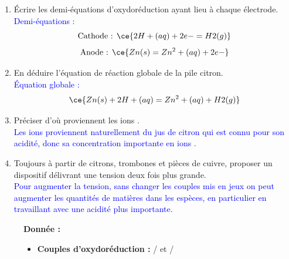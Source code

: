 \documentclass[a4paper,11pt,fleqn]{article}%
\begin{document}
\begin{enumerate}[resume]
    \item Écrire les demi-équations d'oxydoréduction ayant lieu à chaque électrode.\\
    \textcolor{blue}{Demi-équations : $$\text{Cathode : }\ce{2H+(aq) + 2e- = H2(g)}$$
    $$\text{Anode : }\ce{Zn(s) = Zn^2+(aq) + 2e-}$$}
    \item En déduire l'équation de réaction globale de la pile citron.\\
    \textcolor{blue}{Équation globale : $$\ce{Zn(s) + 2H+(aq) = Zn^2+(aq) + H2(g)}$$}
    \item Préciser d'où proviennent les ions .\\
    \textcolor{blue}{Les ions  proviennent naturellement du jus de citron qui est connu pour son acidité, donc sa concentration importante en ions .}
    \item Toujours à partir de citrons, trombones et pièces de cuivre, proposer un dispositif délivrant une tension deux fois plus grande.\\
    \textcolor{blue}{Pour augmenter la tension, sans changer les couples mis en jeux on peut augmenter les quantités de matières dans les espèces, en particulier en travaillant avec une acidité plus importante.}
\end{enumerate}

\begin{figure}[H]
    \begin{minipage}{\linewidth}
    \textbf{Donnée :}
    \begin{itemize}
        \item \textbf{Couples d'oxydoréduction :} / et /
    \end{itemize}
    \end{minipage}
\end{figure}
\end{document}
